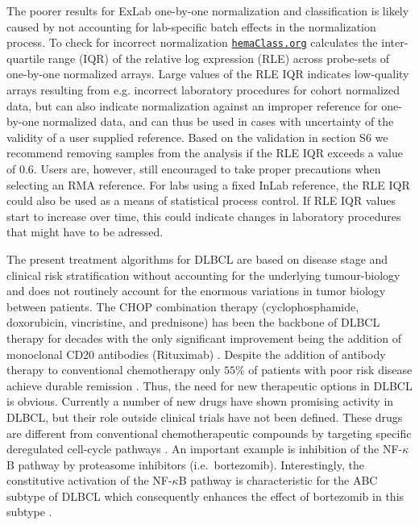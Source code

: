 \documentclass[10pt,letterpaper]{article}
\newcommand{\hemaClass}{\href{http://hemaClass.org}{\texttt{hemaClass.org}}}
\begin{document}
The poorer results for ExLab one-by-one normalization and classification is likely caused by not accounting for lab-specific batch effects in the normalization process. To check for incorrect normalization \hemaClass{} calculates the inter-quartile range (IQR) of the relative log expression (RLE) \mbox{\cite{Bolstad2004b}} across probe-sets of one-by-one normalized arrays. Large values of the RLE IQR indicates low-quality arrays resulting from e.g. incorrect laboratory procedures for cohort normalized data, but can also indicate normalization against an improper reference for one-by-one normalized data, and can thus be used in cases with uncertainty of the validity of a user supplied reference. Based on the validation in  section S6 we recommend removing samples from the analysis if the RLE IQR exceeds a value of $0.6$. Users are, however, still encouraged to take proper precautions when selecting an RMA reference. For labs using a fixed InLab reference, the RLE IQR could also be used as a means of statistical process control. If RLE IQR values start to increase over time, this could indicate changes in laboratory procedures that might have to be adressed.

The present treatment algorithms for DLBCL are based on disease stage and clinical risk stratification without accounting for the underlying tumour-biology \cite{Schmoll2012} and does not routinely account for the enormous variations in tumor biology between patients.
The CHOP combination therapy (cyclophosphamide, doxorubicin, vincristine, and prednisone) has been the backbone of DLBCL therapy for decades with the only significant improvement being the addition of monoclonal CD20 antibodies (Rituximab) \cite{Coiffier2002a}.
Despite the addition of antibody therapy to conventional chemotherapy only $55\%$ of patients with poor risk disease achieve durable remission \cite{Ziepert2010}.
Thus, the need for new therapeutic options in DLBCL is obvious.
Currently a number of new drugs have shown promising activity in DLBCL, but their role outside clinical trials have not been defined.
These drugs are different from conventional chemotherapeutic compounds by targeting specific deregulated cell-cycle pathways \cite{Friedberg2011}.
An important example is inhibition of the NF-$\kappa$B pathway by proteasome inhibitors (i.e.\ bortezomib).
Interestingly, the constitutive activation of the NF-$\kappa$B pathway is characteristic for the ABC subtype of DLBCL which consequently enhances the effect of bortezomib in this subtype \cite{Dunleavy2009}.
\end{document}
